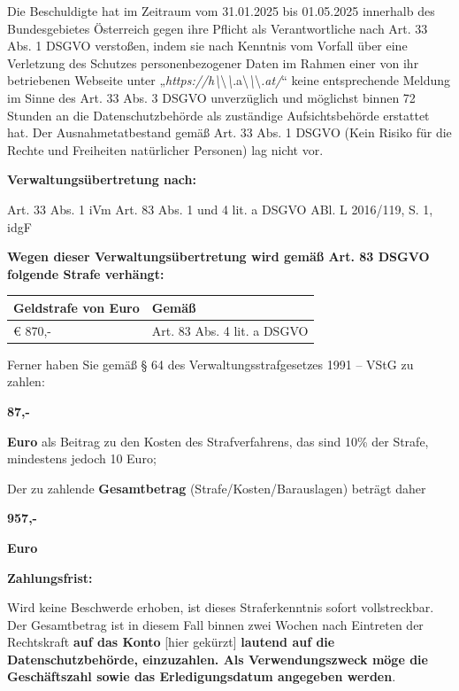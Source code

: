 \documentclass[11pt,a4paper]{article}
\begin{document}
Die Beschuldigte hat im Zeitraum vom 31.01.2025 bis 01.05.2025 innerhalb des Bundesgebietes Österreich gegen ihre Pflicht als Verantwortliche nach Art. 33 Abs. 1 DSGVO verstoßen, indem sie nach Kenntnis vom Vorfall über eine Verletzung des Schutzes personenbezogener Daten im Rahmen einer von ihr betriebenen Webseite unter „\textit{https://h\textbackslash{}}\textbackslash{}\textit{\textbackslash{}}.a\textbackslash{}\textit{\textbackslash{}}\textbackslash{}\textit{.at/}“ keine entsprechende Meldung im Sinne des Art. 33 Abs. 3 DSGVO unverzüglich und möglichst binnen 72 Stunden an die Datenschutzbehörde als zuständige Aufsichtsbehörde erstattet hat. Der Ausnahmetatbestand gemäß Art. 33 Abs. 1 DSGVO (Kein Risiko für die Rechte und Freiheiten natürlicher Personen) lag nicht vor.

\textbf{Verwaltungsübertretung nach:}

Art. 33 Abs. 1 iVm Art. 83 Abs. 1 und 4 lit. a DSGVO ABl. L 2016/119, S. 1, idgF

\textbf{Wegen dieser Verwaltungsübertretung wird gemäß Art. 83 DSGVO folgende Strafe verhängt:}

\begin{table}[h]
\begin{tabular}{|l|l|}
\hline
Geldstrafe von Euro & Gemäß \\ \hline
€ 870,- & Art. 83 Abs. 4 lit. a DSGVO \\ \hline
\end{tabular}
\end{table}

Ferner haben Sie gemäß § 64 des Verwaltungsstrafgesetzes 1991 – VStG zu zahlen:

\textbf{87,-}

\textbf{Euro} als Beitrag zu den Kosten des Strafverfahrens, das sind 10\% der Strafe, mindestens jedoch 10 Euro;

Der zu zahlende \textbf{Gesamtbetrag} (Strafe/Kosten/Barauslagen) beträgt daher

\textbf{957,-}

\textbf{Euro}

\textbf{Zahlungsfrist:}

Wird keine Beschwerde erhoben, ist dieses Straferkenntnis sofort vollstreckbar. Der Gesamtbetrag ist in diesem Fall binnen zwei Wochen nach Eintreten der Rechtskraft \textbf{auf das Konto} [hier gekürzt] \textbf{lautend auf die Datenschutzbehörde, einzuzahlen. Als Verwendungszweck möge die Geschäftszahl sowie das Erledigungsdatum angegeben werden}.
\end{document}
